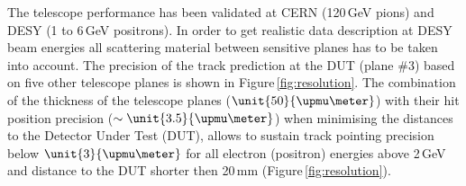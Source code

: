 
The telescope performance has been validated at CERN (120\,GeV pions) and DESY (1 to 6\,GeV positrons). 
In order to get realistic data description at DESY beam energies all scattering material between sensitive planes has to be taken into account. 
The precision of the track prediction at the DUT (plane \#3) based on five other telescope planes is shown in Figure\,\ref{fig:resolution}. 
The combination of the thickness of the telescope planes ($\unit{50}{\upmu\meter}$) with their hit position precision ($\sim\unit{3.5}{\upmu\meter}$)
 when minimising the distances to the Detector Under Test (DUT), 
 allows to sustain track pointing precision below $\unit{3}{\upmu\meter}$ for all electron (positron) energies above 2\,GeV and distance to the DUT shorter then 20\,mm (Figure\,\ref{fig:resolution}).
